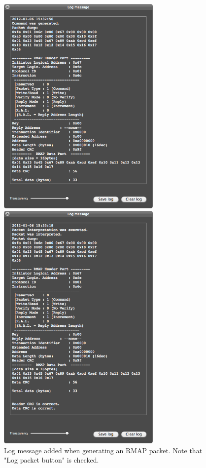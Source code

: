 \documentclass[a4paper,10pt]{article}
\begin{document}
\begin{figure}[htb]
\begin{center}
\begin{minipage}[t]{0.45\hsize}
\begin{center}
\includegraphics[width=8cm]{figures/SpaceWireRMAPGUI/RMAPPacketUtilitySection_Log_Generate.png}
\vspace{-2mm}
\caption{Log message added when generating an RMAP packet. Note that "Log packet button" is checked. }
\label{figure:RMAPPacketUtilitySection_Log_Generate}
\end{center}
\end{minipage}
\hspace{0.05\hsize}
\begin{minipage}[t]{0.45\hsize}
\begin{center}
\includegraphics[width=8cm]{figures/SpaceWireRMAPGUI/RMAPPacketUtilitySection_Log_Interpret.png}

\end{center}
\end{minipage}
\end{center}
\end{figure}
\end{document}
